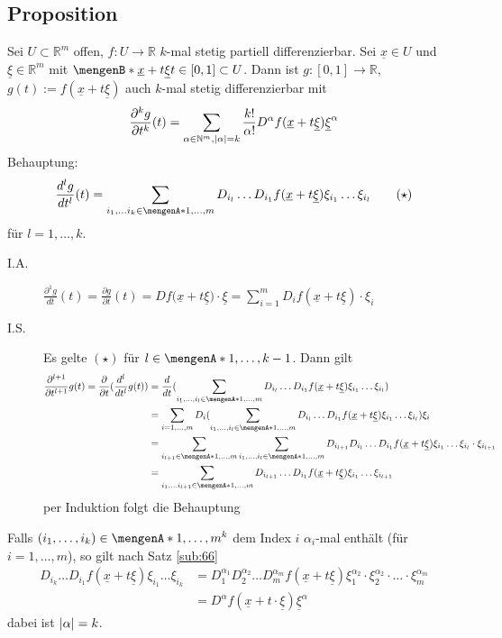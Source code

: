 \subsection{Proposition} %
\label{sub:713}
Sei $U \subset \mathds{R}^m$ offen, $f : U \to \mathds{R}$ $k$-mal stetig partiell differenzierbar. Sei $\underline{x} \in U$ und $\underline{\xi} \in \mathds{R}^m$ mit
$\set[\underline{x} + t \underline{\xi}]{t \in [0,1]} \subset U $. Dann ist $g : [0,1] \to \mathds{R}$, $g(t) := f( \underline{x} + t \underline{\xi})$ auch $k$-mal
stetig differenzierbar mit
\[
	\frac{\partial^k g}{\partial t^k} (t) =   \sum_{\alpha \in \mathbb{N}^m, \lvert\alpha\rvert=k } \frac{k!}{\alpha!} D^\alpha f(\underline{x} + t \underline{\xi}) \underline{\xi}^\alpha  
\]
Behauptung: 
\[
	 \frac{d^l g}{d t^l} (t) = \sum_{i_1, \ldots i_k \in \set{1, \ldots , m} }  D_{i_l} \ldots D_{i_1} f( \underline{x} + t \underline{\xi}) \xi_{i_1} \ldots \xi_{i_l}  
	 \tag{$\star$}
\]
für $l= 1, \ldots , k$.
\begin{description}
	\item[I.A.] $ \frac{\partial^1 g}{d t} (t) = \frac{\partial g}{\partial t} (t)   = D f \big( \underline{x} + t \underline{\xi} \big) \cdot  \underline{\xi}  = \sum_{i=1}^{m} D_i f ( \underline{x} + t \underline{\xi}) \cdot \xi_i$ 
	\item[I.S.] Es gelte $(\star)$ für $l \in \set{1, \ldots , k-1} $. Dann gilt
	\begin{align*}
		\frac{\partial ^{l+1}}{\partial t^{l+1}} g(t) = \frac{\partial }{ \partial t} \enbrace{\frac{d^l}{d t^l} g(t) } &=  \frac{d}{dt} \enbrace{\sum_{i_1, \ldots , i_l 
		\in \set{1, \ldots ,m}} D_{i_l} \ldots D_{i_1} f ( \underline{x} + t \underline{\xi} ) \xi_{i_1} \ldots  \xi_{i_l} }  \\
		&= \sum_{i=1, \ldots , m} D_i \enbrace{\sum_{i_1, \ldots , i_l 
		\in \set{1, \ldots ,m}} D_{i_l} \ldots D_{i_1} f ( \underline{x} + t \underline{\xi} ) \xi_{i_1} \ldots  \xi_{i_l}   } \xi_i \\
		&=  \sum_{i_{l+1} \in \set{1, \ldots , m} } \sum_{i_1, \ldots , i_l \in \set{1, \ldots , m}  }D_{i_{l+1}} D_{i_l} \ldots  D_{i_1} f( \underline{x} + t \underline{\xi}) \xi_{i_1}
		\ldots \xi_{i_l} \cdot \xi_{i_{l+1}} \\
		&=    \sum_{i_1, \ldots i_{l+1} \in \set{1, \ldots , m} } D_{i_{l+1}} \ldots D_{i_1} f(\underline{x} + t \underline{\xi}) \xi_{i_1} \ldots \xi_{i_{l+1}} 
	\end{align*}
	per Induktion folgt die Behauptung
\end{description}
Falls $(i_1, \ldots , i_k) \in \set{1, \ldots , m}^k $ dem Index $i$ $\alpha_i$-mal enthält (für $i= 1, \ldots ,m$), so gilt nach Satz \ref{sub:66}
\begin{align*}
	D_{i_k} \ldots D_{i_1} f (\underline{x} + t \underline{\xi}) \xi_{i_1} \ldots \xi_{i_k} &= D_1^{\alpha_1} D_2^{\alpha_2} \ldots D_m^{\alpha_m} f (\underline{x} + t 
	\underline{\xi})\xi_1^{\alpha_2} \cdot \xi_2^{\alpha_2} \cdot \ldots \cdot \xi_m^{\alpha_m} \\
	&= D^\alpha f( \underline{x} + t \cdot \underline{\xi}) \underline{\xi}^\alpha \tag{mit $\alpha= (\alpha_1, \ldots , \alpha_m)$}
\end{align*}
dabei ist $\lvert\alpha\rvert = k $. 

